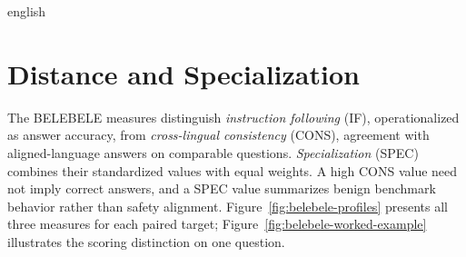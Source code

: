 \begin{otherlanguage*}{english}
\section{Distance and Specialization}
\label{sec:graded-distance-spec}
The BELEBELE measures distinguish \emph{instruction following} (IF), operationalized as answer accuracy, from \emph{cross-lingual consistency} (CONS), agreement with aligned-language answers on comparable questions. \emph{Specialization} (SPEC) combines their standardized values with equal weights. A high CONS value need not imply correct answers, and a SPEC value summarizes benign benchmark behavior rather than safety alignment. Figure~\ref{fig:belebele-profiles} presents all three measures for each paired target; Figure~\ref{fig:belebele-worked-example} illustrates the scoring distinction on one question.


\end{otherlanguage*}
